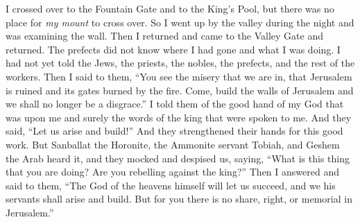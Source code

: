 \begin{biblechapter}
\verse I crossed over to the Fountain Gate and to the King’s Pool, but there was no place for \textit{my mount} to cross over.
\verse So I went up by the valley during the night and was examining the wall. Then I returned and came to the Valley Gate and returned.
\verse The prefects did not know where I had gone and what I was doing. I had not yet told the Jews, the priests, the nobles, the prefects, and the rest of the workers.
\verse Then I said to them, “You see the misery that we are in, that Jerusalem is ruined and its gates burned by the fire. Come, build the walls of Jerusalem and we shall no longer be a disgrace.”
\verse I told them of the good hand of my God that was upon me and surely the words of the king that were spoken to me. And they said, “Let us arise and build!” And they strengthened their hands for this good work.
\verse But Sanballat the Horonite, the Ammonite servant Tobiah, and Geshem the Arab heard it, and they mocked and despised us, saying, “What is this thing that you are doing? Are you rebelling against the king?”
\verse Then I answered and said to them, “The God of the heavens himself will let us succeed, and we his servants shall arise and build. But for you there is no share, right, or memorial in Jerusalem.”
\end{biblechapter}

